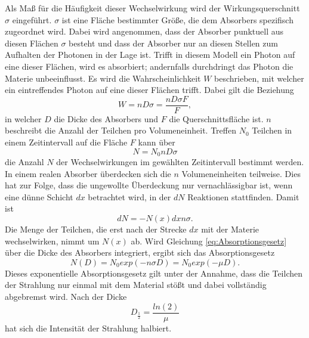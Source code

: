 Als Maß für die Häufigkeit dieser Wechselwirkung wird der Wirkungsquerschnitt $\sigma$ eingeführt.
$\sigma$ ist eine Fläche bestimmter Größe, die dem Absorbers spezifisch zugeordnet wird. 
Dabei wird angenommen, dass der Absorber punktuell aus diesen Flächen $\sigma$ besteht und dass der Absorber nur an diesen Stellen zum Aufhalten der Photonen in der Lage ist.
Trifft in diesem Modell ein Photon auf eine dieser Flächen, wird es absorbiert; andernfalls durchdringt das Photon die Materie unbeeinflusst.
Es wird die Wahrscheinlichkeit $W$ beschrieben, mit welcher ein eintreffendes Photon auf eine dieser Flächen trifft. 
Dabei gilt die Beziehung 
\begin{equation}
	W=n D \sigma =\frac{n D \sigma F}{F},
\end{equation}
in welcher $D$ die Dicke des Absorbers und $F$ die Querschnittsfläche ist. 
$n$ beschreibt die Anzahl der Teilchen pro Volumeneinheit.
Treffen $N_0$ Teilchen in einem Zeitintervall auf die Fläche $F$ kann über
\begin{equation}
	N=N_0 n D \sigma
\end{equation}
die Anzahl $N$ der Wechselwirkungen im gewählten Zeitintervall bestimmt werden. 
In einem realen Absorber überdecken sich die $n$ Volumeneinheiten teilweise. 
Dies hat zur Folge, dass die ungewollte Überdeckung nur vernachlässigbar ist, wenn eine dünne Schicht $dx$ betrachtet wird, in der $dN$ Reaktionen stattfinden. 
Damit ist
\begin{equation}
	dN=-N(x) dx n \sigma.
	\label{eq:Absorptionsgesetz_Vorstufe}
\end{equation}
Die Menge der Teilchen, die erst nach der Strecke $dx$ mit der Materie wechselwirken, nimmt um $N(x)$ ab. 
Wird Gleichung \eqref{eq:Absorptionsgesetz} über die Dicke des Absorbers integriert, ergibt sich das Absorptionsgesetz
\begin{equation}
	N(D)=N_0 exp(-n \sigma D)=N_0 exp(-\mu D).
	\label{eq:Absorptionsgesetz}
\end{equation}
Dieses exponentielle Absorptionsgesetz gilt unter der Annahme, dass die Teilchen der Strahlung nur einmal mit dem Material stößt und dabei vollständig abgebremst wird.
Nach der Dicke
\begin{equation}
D_\frac{1}{2}=\frac{ln(2)}{\mu}
\end{equation}
hat sich die Intensität der Strahlung halbiert.

